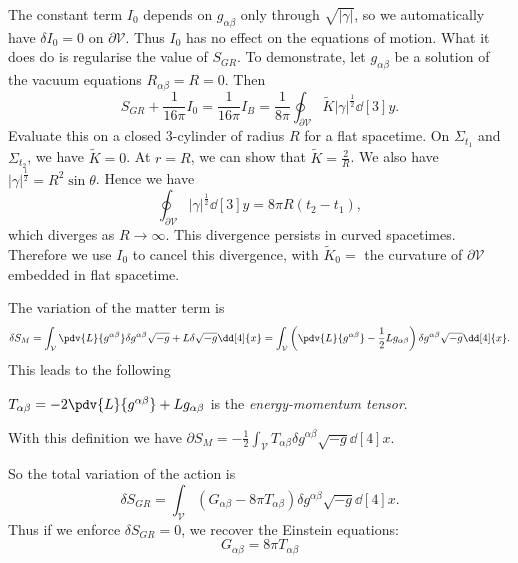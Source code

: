 \documentclass{jknotes}
\begin{document}
The constant term \(I_0\) depends on \(g_{\alpha\beta}\) only through \(\sqrt{|\gamma|}\), so we automatically have \(\delta I_0 = 0\) on \(\partial \mathcal{V}\). Thus \(I_0\) has no effect on the equations of motion. What it does do is regularise the value of \(S_{GR}\). To demonstrate, let \(g_{\alpha\beta}\) be a solution of the vacuum equations \(R_{\alpha\beta} = R = 0\). Then 
\begin{equation}
    S_{GR} + \frac1{16\pi}I_0 = \frac1{16\pi}I_B = \frac1{8\pi} \oint_{\partial\mathcal{V}} \tilde{K}|\gamma|^{\frac12}\dd[3]{y}.
\end{equation}
Evaluate this on a closed 3-cylinder of radius \(R\) for a flat spacetime. On \(\Sigma_{t_1}\) and \(\Sigma_{t_2}\), we have \(\tilde{K}=0\). At \(r=R\), we can show that \(\tilde{K}=\frac2R\). We also have \(|\gamma|^{\frac12} = R^2\sin\theta\). Hence we have
\begin{equation}
    \oint_{\partial\mathcal{V}}|\gamma|^{\frac12}\dd[3]{y} = 8\pi R(t_2-t_1),
\end{equation}
which diverges as \(R\to \infty\). This divergence persists in curved spacetimes. Therefore we use \(I_0\) to cancel this divergence, with \(\tilde{K}_0 = \) the curvature of \(\partial\mathcal{V}\) embedded in flat spacetime.

The variation of the matter term is
\begin{equation}
    \delta S_M = \int_{\mathcal{V}}\pdv{L}{g^{\alpha\beta}} \delta g^{\alpha\beta}\sqrt{-g} + L\delta\sqrt{-g}\dd[4]{x} = \int_{\mathcal{V}}\left(\pdv{L}{g^{\alpha\beta}}-\frac12Lg_{\alpha\beta}\right)\delta g^{\alpha\beta}\sqrt{-g}\dd[4]{x}.
\end{equation}
This leads to the following
\begin{defn}
    \(T_{\alpha\beta} = -2\pdv{L}{g^{\alpha\beta}} + Lg_{\alpha\beta}\) is the \emph{energy-momentum tensor}.
\end{defn}
With this definition we have \(\partial S_M = -\frac12 \int_{\mathcal{V}}T_{\alpha\beta}\delta g^{\alpha\beta}\sqrt{-g}\dd[4]{x}\).

So the total variation of the action is
\begin{equation}
    \delta S_{GR} = \int_{\mathcal{V}} (G_{\alpha\beta} - 8\pi T_{\alpha\beta})\delta g^{\alpha\beta}\sqrt{-g}\dd[4]{x}.
\end{equation}
Thus if we enforce \(\delta S_{GR}=0\), we recover the Einstein equations:
\begin{equation}
    G_{\alpha\beta} = 8\pi T_{\alpha\beta}
\end{equation}
\end{document}
